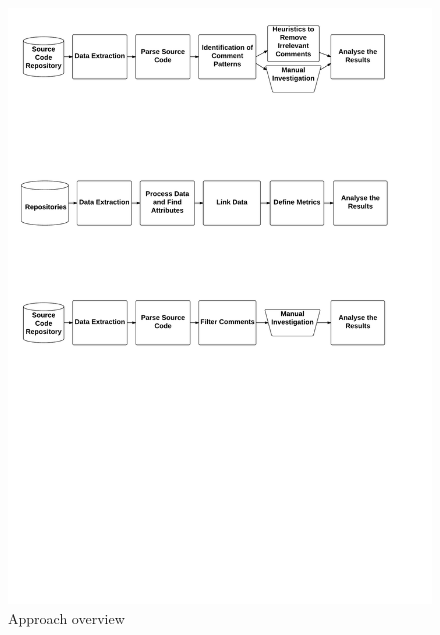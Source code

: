 \begin{figure}[thb!]
  \centering
  \label{fig:approach}
  \includegraphics[width=1\textwidth]{figures/Approach}
  \caption{Approach overview}
\end{figure}

